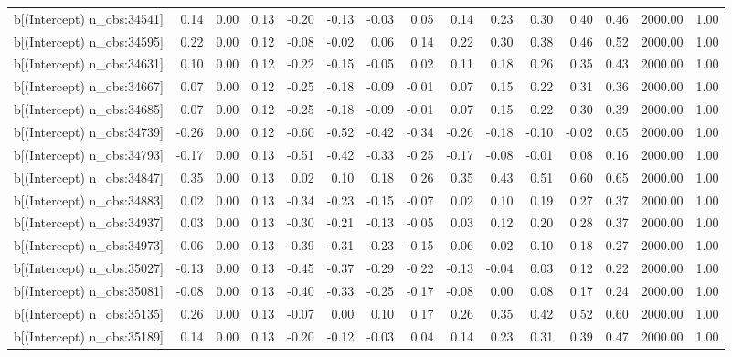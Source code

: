 \begin{table}[ht]
\begin{tabular}{rrrrrrrrrrrrrrr}
  b[(Intercept) n\_obs:34541] & 0.14 & 0.00 & 0.13 & -0.20 & -0.13 & -0.03 & 0.05 & 0.14 & 0.23 & 0.30 & 0.40 & 0.46 & 2000.00 & 1.00 \\ 
  b[(Intercept) n\_obs:34595] & 0.22 & 0.00 & 0.12 & -0.08 & -0.02 & 0.06 & 0.14 & 0.22 & 0.30 & 0.38 & 0.46 & 0.52 & 2000.00 & 1.00 \\ 
  b[(Intercept) n\_obs:34631] & 0.10 & 0.00 & 0.12 & -0.22 & -0.15 & -0.05 & 0.02 & 0.11 & 0.18 & 0.26 & 0.35 & 0.43 & 2000.00 & 1.00 \\ 
  b[(Intercept) n\_obs:34667] & 0.07 & 0.00 & 0.12 & -0.25 & -0.18 & -0.09 & -0.01 & 0.07 & 0.15 & 0.22 & 0.31 & 0.36 & 2000.00 & 1.00 \\ 
  b[(Intercept) n\_obs:34685] & 0.07 & 0.00 & 0.12 & -0.25 & -0.18 & -0.09 & -0.01 & 0.07 & 0.15 & 0.22 & 0.30 & 0.39 & 2000.00 & 1.00 \\ 
  b[(Intercept) n\_obs:34739] & -0.26 & 0.00 & 0.12 & -0.60 & -0.52 & -0.42 & -0.34 & -0.26 & -0.18 & -0.10 & -0.02 & 0.05 & 2000.00 & 1.00 \\ 
  b[(Intercept) n\_obs:34793] & -0.17 & 0.00 & 0.13 & -0.51 & -0.42 & -0.33 & -0.25 & -0.17 & -0.08 & -0.01 & 0.08 & 0.16 & 2000.00 & 1.00 \\ 
  b[(Intercept) n\_obs:34847] & 0.35 & 0.00 & 0.13 & 0.02 & 0.10 & 0.18 & 0.26 & 0.35 & 0.43 & 0.51 & 0.60 & 0.65 & 2000.00 & 1.00 \\ 
  b[(Intercept) n\_obs:34883] & 0.02 & 0.00 & 0.13 & -0.34 & -0.23 & -0.15 & -0.07 & 0.02 & 0.10 & 0.19 & 0.27 & 0.37 & 2000.00 & 1.00 \\ 
  b[(Intercept) n\_obs:34937] & 0.03 & 0.00 & 0.13 & -0.30 & -0.21 & -0.13 & -0.05 & 0.03 & 0.12 & 0.20 & 0.28 & 0.37 & 2000.00 & 1.00 \\ 
  b[(Intercept) n\_obs:34973] & -0.06 & 0.00 & 0.13 & -0.39 & -0.31 & -0.23 & -0.15 & -0.06 & 0.02 & 0.10 & 0.18 & 0.27 & 2000.00 & 1.00 \\ 
  b[(Intercept) n\_obs:35027] & -0.13 & 0.00 & 0.13 & -0.45 & -0.37 & -0.29 & -0.22 & -0.13 & -0.04 & 0.03 & 0.12 & 0.22 & 2000.00 & 1.00 \\ 
  b[(Intercept) n\_obs:35081] & -0.08 & 0.00 & 0.13 & -0.40 & -0.33 & -0.25 & -0.17 & -0.08 & 0.00 & 0.08 & 0.17 & 0.24 & 2000.00 & 1.00 \\ 
  b[(Intercept) n\_obs:35135] & 0.26 & 0.00 & 0.13 & -0.07 & 0.00 & 0.10 & 0.17 & 0.26 & 0.35 & 0.42 & 0.52 & 0.60 & 2000.00 & 1.00 \\ 
  b[(Intercept) n\_obs:35189] & 0.14 & 0.00 & 0.13 & -0.20 & -0.12 & -0.03 & 0.04 & 0.14 & 0.23 & 0.31 & 0.39 & 0.47 & 2000.00 & 1.00 \\ 

\end{tabular}
\end{table}
